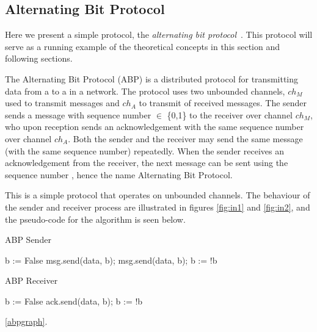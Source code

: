 \subsection{Alternating Bit Protocol}
Here we present a simple protocol, the \emph{alternating bit protocol}~\cite{bartlett1969note}. This protocol will serve as a running example of the theoretical concepts in this section and following sections.

The Alternating Bit Protocol (ABP) is a distributed protocol for transmitting data from a  to a  in a network. The protocol uses two unbounded channels, $ch_M$ used to transmit messages and $ch_A$ to transmit  of received messages. The sender sends a message with sequence number  $\in$ \{0,1\} to the receiver over channel $ch_M$, who upon reception sends an acknowledgement with the same sequence number over channel $ch_A$. Both the sender and the receiver may send the same message (with the same sequence number) repeatedly. When the sender receives an acknowledgement from the receiver, the next message can be sent using the sequence number , hence the name Alternating Bit Protocol.

This is a simple protocol that operates on unbounded channels. The behaviour of the sender and receiver process are illustrated in figures \ref{fig:in1} and \ref{fig:in2}, and the pseudo-code for the algorithm is seen below.

\begin{algorithm}
  \caption{ABP Sender}
  \label{senderpseudo}
\begin{algorithmic}[1]
    \State b := False 
      \State msg.send(data, b);
       
      \State msg.send(data, b); 
      \EndWhile
      \State b := !b 
    \EndFor
\end{algorithmic}
\end{algorithm}


\begin{algorithm}
  \caption{ABP Receiver}
  \label{senderpseudo}
\begin{algorithmic}[1]
    \State b := False 
       
      \State ack.send(data, b); 
      \EndWhile
      \State b := !b 
    \EndFor

\end{algorithmic}
\end{algorithm}
\ref{abpgraph}.

